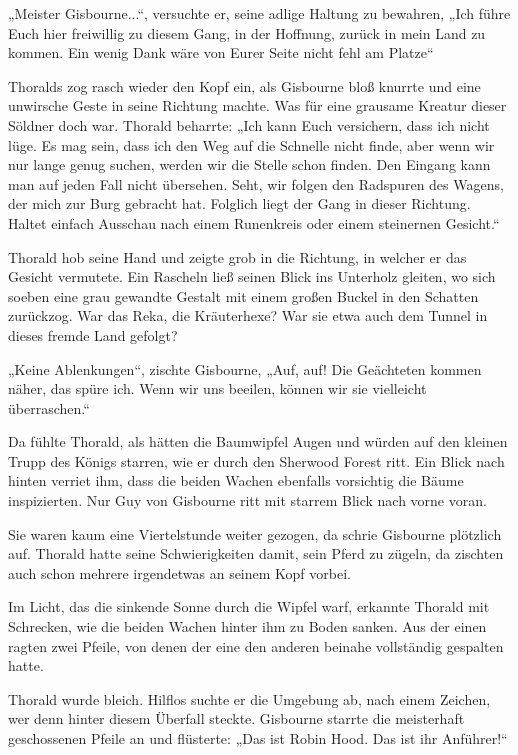 „Meister Gisbourne...“, versuchte er, seine adlige Haltung zu bewahren, „Ich führe Euch hier freiwillig zu diesem Gang, in der Hoffnung, zurück in mein Land zu kommen. Ein wenig Dank wäre von Eurer Seite nicht fehl am Platze“

Thoralds zog rasch wieder den Kopf ein, als Gisbourne bloß knurrte und eine unwirsche Geste in seine Richtung machte. Was für eine grausame Kreatur dieser Söldner doch war. Thorald beharrte: „Ich kann Euch versichern, dass ich nicht lüge. Es mag sein, dass ich den Weg auf die Schnelle nicht finde, aber wenn wir nur lange genug suchen, werden wir die Stelle schon finden. Den Eingang kann man auf jeden Fall nicht übersehen. Seht, wir folgen den Radspuren des Wagens, der mich zur Burg gebracht hat. Folglich liegt der Gang in dieser Richtung. Haltet einfach Ausschau nach einem Runenkreis oder einem steinernen Gesicht.“

Thorald hob seine Hand und zeigte grob in die Richtung, in welcher er das Gesicht vermutete. Ein Rascheln ließ seinen Blick ins Unterholz gleiten, wo sich soeben eine grau gewandte Gestalt mit einem großen Buckel in den Schatten zurückzog. War das Reka, die Kräuterhexe? War sie etwa auch dem Tunnel in dieses fremde Land gefolgt?

„Keine Ablenkungen“, zischte Gisbourne, „Auf, auf! Die Geächteten kommen näher, das spüre ich. Wenn wir uns beeilen, können wir sie vielleicht überraschen.“

Da fühlte Thorald, als hätten die Baumwipfel Augen und würden auf den kleinen Trupp des Königs starren, wie er durch den Sherwood Forest ritt. Ein Blick nach hinten verriet ihm, dass die beiden Wachen ebenfalls vorsichtig die Bäume inspizierten. Nur Guy von Gisbourne ritt mit starrem Blick nach vorne voran.

Sie waren kaum eine Viertelstunde weiter gezogen, da schrie Gisbourne plötzlich auf. Thorald hatte seine Schwierigkeiten damit, sein Pferd zu zügeln, da zischten auch schon mehrere irgendetwas an seinem Kopf vorbei.

Im Licht, das die sinkende Sonne durch die Wipfel warf, erkannte Thorald mit Schrecken, wie die beiden Wachen hinter ihm zu Boden sanken. Aus der einen ragten zwei Pfeile, von denen der eine den anderen beinahe vollständig gespalten hatte.

Thorald wurde bleich. Hilflos suchte er die Umgebung ab, nach einem Zeichen, wer denn hinter diesem Überfall steckte. Gisbourne starrte die meisterhaft geschossenen Pfeile an und flüsterte: „Das ist Robin Hood. Das ist ihr Anführer!“

